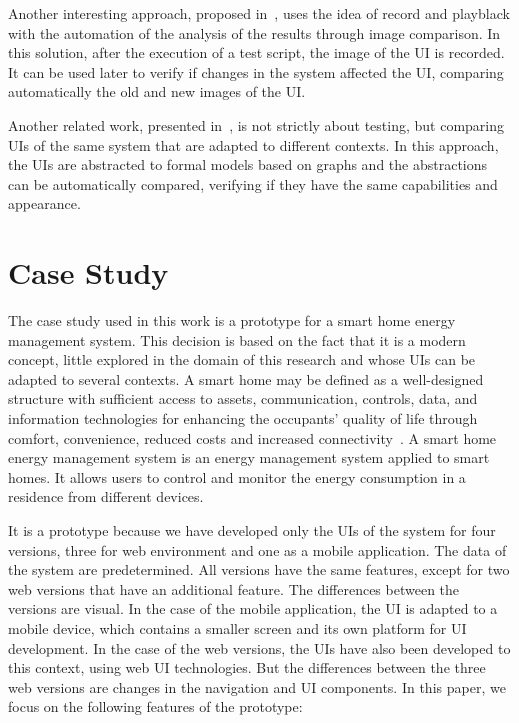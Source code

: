 \documentclass{chi-ext}
\begin{document}
Another interesting approach, proposed in~\cite{test-image-comparison-korea}, uses the idea of record and playblack with the automation of the analysis of the results through image comparison. In this solution, after the execution of a test script, the image of the UI is recorded. It can be used later to verify if changes in the system affected the UI, comparing automatically the old and new images of the UI.
 
Another related work, presented in~\cite{ui-equilavance-raquel}, is not strictly about testing, but comparing UIs of the same system that are adapted to different contexts. In this approach, the UIs are abstracted to formal models based on graphs and the abstractions can be automatically compared, verifying if  they have the same capabilities and appearance.

\section{Case Study}

The case study used in this work is a prototype for a smart home energy management system. This decision is based on the fact that it is a modern concept, little explored in the domain of this research and whose UIs can be adapted to several contexts. A smart home may be defined as a well-designed structure with sufficient access to assets, communication, controls, data, and information technologies for enhancing the occupants' quality of life through comfort, convenience, reduced costs and increased connectivity~\cite{smart-home-harper}. A smart home energy management system is an energy management system applied to smart homes. It allows users to control and monitor the energy consumption in a residence from different devices. 

It is a prototype because we have developed only the UIs of the system for four versions, three for web environment and one as a mobile application. The data of the system are predetermined. All versions have the same features, except for two web versions that have an additional feature. The differences between the versions are visual. In the case of the mobile application, the UI is adapted to a mobile device, which contains a smaller screen and its own platform for UI development. In the case of the web versions, the UIs have also been developed to this context, using web UI technologies. But the differences between the three web versions are changes in the navigation and UI components. In this paper, we focus on the following features of the prototype:
\end{document}
